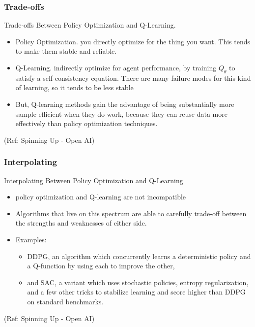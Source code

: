 \begin{frame}[fragile]\frametitle{Trade-offs}

Trade-offs Between Policy Optimization and Q-Learning. 

\begin{itemize}
\item Policy Optimization. you directly optimize for the thing you want. This tends to make them stable and reliable. 
\item Q-Learning. indirectly optimize for agent performance, by training $Q_{\theta}$ to satisfy a self-consistency equation. There are many failure modes for this kind of learning, so it tends to be less stable
\item But, Q-learning methods gain the advantage of being substantially more sample efficient when they do work, because they can reuse data more effectively than policy optimization techniques.
\end{itemize}

{\tiny (Ref: Spinning Up - Open AI)}
\end{frame}

\begin{frame}[fragile]\frametitle{Interpolating }

Interpolating Between Policy Optimization and Q-Learning

\begin{itemize}
\item policy optimization and Q-learning are not incompatible
\item Algorithms that live on this spectrum are able to carefully trade-off between the strengths and weaknesses of either side.
\item Examples:
\begin{itemize}
\item DDPG, an algorithm which concurrently learns a deterministic policy and a Q-function by using each to improve the other,
\item and SAC, a variant which uses stochastic policies, entropy regularization, and a few other tricks to stabilize learning and score higher than DDPG on standard benchmarks.
\end{itemize}

\end{itemize}

{\tiny (Ref: Spinning Up - Open AI)}
\end{frame}

